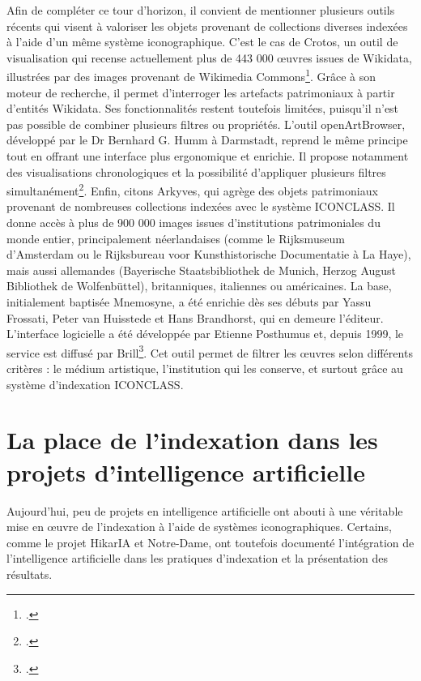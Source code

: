 Afin de compléter ce tour d’horizon, il convient de mentionner plusieurs outils récents qui visent à valoriser les objets provenant de collections diverses indexées à l’aide d’un même système iconographique. C’est le cas de Crotos, un outil de visualisation qui recense actuellement plus de 443 000 œuvres issues de Wikidata, illustrées par des images provenant de Wikimedia Commons\footcite{Crotos}. Grâce à son moteur de recherche, il permet d’interroger les artefacts patrimoniaux à partir d’entités Wikidata. Ses fonctionnalités restent toutefois limitées, puisqu’il n’est pas possible de combiner plusieurs filtres ou propriétés. L’outil openArtBrowser, développé par le Dr Bernhard G. Humm à Darmstadt, reprend le même principe tout en offrant une interface plus ergonomique et enrichie. Il propose notamment des visualisations chronologiques et la possibilité d’appliquer plusieurs filtres simultanément\footcites{hummOpenArtBrowser}{hummFascinatingOpenData2020}. Enfin, citons Arkyves, qui agrège des objets patrimoniaux provenant de nombreuses collections indexées avec le système ICONCLASS. Il donne accès à plus de 900 000 images issues d’institutions patrimoniales du monde entier, principalement néerlandaises (comme le Rijksmuseum d’Amsterdam ou le Rijksbureau voor Kunsthistorische Documentatie à La Haye), mais aussi allemandes (Bayerische Staatsbibliothek de Munich, Herzog August Bibliothek de Wolfenbüttel), britanniques, italiennes ou américaines. La base, initialement baptisée Mnemosyne, a été enrichie dès ses débuts par Yassu Frossati, Peter van Huisstede et Hans Brandhorst, qui en demeure l’éditeur. L’interface logicielle a été développée par Etienne Posthumus et, depuis 1999, le service est diffusé par Brill\footcite{posthumusArkyves1999}. Cet outil permet de filtrer les œuvres selon différents critères : le médium artistique, l’institution qui les conserve, et surtout grâce au système d’indexation ICONCLASS.

\section[Indexation et projets IA]{La place de l’indexation dans les projets d'intelligence artificielle}

Aujourd’hui, peu de projets en intelligence artificielle ont abouti à une véritable mise en œuvre de l’indexation à l’aide de systèmes iconographiques. Certains, comme le projet HikarIA et Notre-Dame, ont toutefois documenté l’intégration de l’intelligence artificielle dans les pratiques d’indexation et la présentation des résultats.

